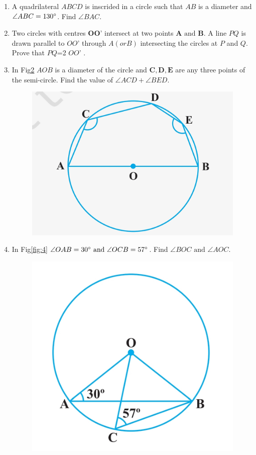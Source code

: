 \documentclass[12pt]{article}
\let\vec\mathbf
\begin{document}
\begin{enumerate}
\begin{figure}[h!]
\caption{}
\label{fig:2}
\end{figure}
\item A quadrilateral ${ABCD}$ is inscrided in a circle such that $AB$ is a diameter and $\angle{ABC} = 130\degree$. Find $\angle{BAC}$.
\item Two circles with centres $\vec{O}$$\vec{O}$' intersect at two points $\vec{A}\text{ and }\vec{B}$. A line $PQ$ is drawn parallel to $OO$' through $A(or B)$ intersecting the circles at $P$ and $Q$. Prove that $PQ$=2  $OO$' .
\item In Fig\ref{fig:3} $AOB$ is a diameter of the circle and $\vec{C},\vec{D},\vec{E}$ are any three points of the semi-circle. Find the value of $\angle ACD + \angle BED$.
\begin{figure}[h!]
   \includegraphics[width=\columnwidth]{figs/image3.jpg}
\caption{}
\label{fig:3}
\end{figure}
\item In Fig\ref{fig:4} $\angle OAB = 30\degree\text{ and }\angle OCB = 57\degree$. Find $\angle BOC\text{ and }\angle AOC$.
\begin{figure}[h!]
   \includegraphics[width=\columnwidth]{figs/image4.jpg}

\end{figure}
\end{enumerate}
\end{document}
